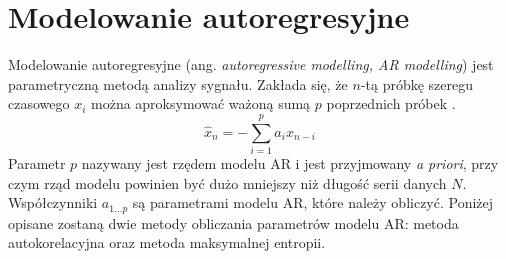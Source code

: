 \documentclass[notitlepage]{report}
\begin{document}
\section{Modelowanie autoregresyjne}
Modelowanie autoregresyjne (ang. \textit{autoregressive modelling, AR modelling}) jest parametryczną metodą analizy sygnału. Zakłada się, że $n$-tą próbkę szeregu czasowego $x_i$ można aproksymować ważoną sumą $p$ poprzednich próbek \cite{pardey}.
\begin{equation}
\hat{x}_n = -\sum_{i=1}^{p}a_ix_{n-i}
\end{equation}
Parametr $p$ nazywany jest rzędem modelu AR i jest przyjmowany \textit{a priori}, przy czym rząd modelu powinien być dużo mniejszy niż długość serii danych $N$. Współczynniki $a_{1...p}$ są parametrami modelu AR, które należy obliczyć. Poniżej opisane zostaną dwie metody obliczania parametrów modelu AR: metoda autokorelacyjna oraz metoda maksymalnej entropii.
\end{document}
